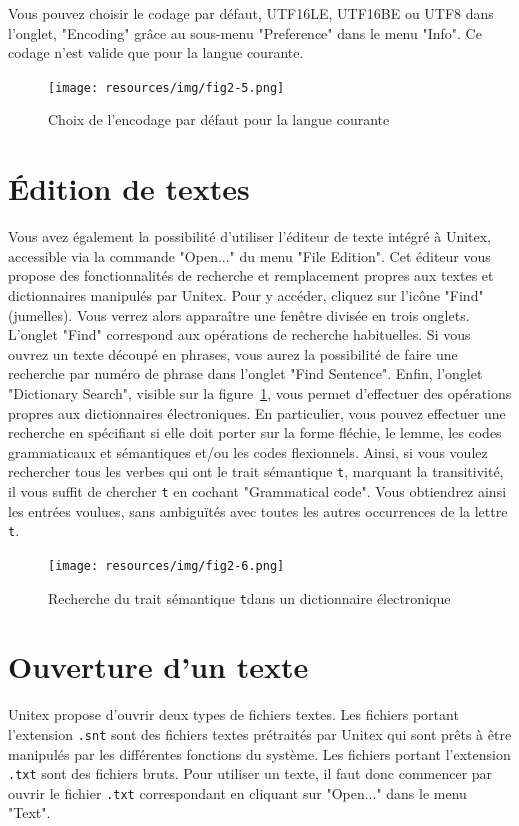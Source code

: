 \bigskip
\noindent 
Vous pouvez choisir le codage par défaut, UTF16LE, UTF16BE ou UTF8 dans l'onglet, "Encoding" grâce
au sous-menu "Preference"  dans le menu "Info". Ce codage n'est valide que pour la langue
courante.

\begin{figure}[!ht]
\begin{center}
\texttt{[image: resources/img/fig2-5.png]}
\caption{Choix de l'encodage par défaut pour la langue courante}
\end{center}
\end{figure}

\section{Édition de textes}
Vous avez également la possibilité d’utiliser l’éditeur de texte intégré à Unitex, accessible
via la commande "Open..." du menu "File Edition". Cet éditeur vous propose des fonctionnalités
de recherche et remplacement propres aux textes et dictionnaires manipulés par Unitex. Pour y
accéder, cliquez sur l’icône "Find" (jumelles). Vous verrez alors apparaître une fenêtre divisée en
trois onglets. L’onglet "Find" correspond aux opérations de recherche habituelles. Si vous ouvrez un
texte découpé en phrases, vous aurez la possibilité de faire une recherche par numéro de phrase dans
l’onglet "Find Sentence". Enfin, l’onglet "Dictionary Search", visible sur la
figure~\ref{dictionary-search}, vous permet d’effectuer des opérations propres aux dictionnaires
électroniques. En particulier, vous pouvez effectuer une recherche en spécifiant si elle doit porter
sur la forme fléchie, le lemme, les codes grammaticaux et sémantiques et/ou les codes flexionnels.
Ainsi, si vous voulez rechercher tous les verbes qui ont le trait sémantique
\verb$t$, marquant la transitivité, il vous suffit de chercher \verb$t$ en cochant
"Grammatical code". Vous obtiendrez ainsi les entrées voulues, sans ambiguïtés avec toutes les
autres occurrences de la lettre \verb$t$.


\begin{figure}[!ht]
\begin{center}
\texttt{[image: resources/img/fig2-6.png]}
\caption{Recherche du trait sémantique \texttt{t}dans un dictionnaire
électronique\label{dictionary-search}}
\end{center}
\end{figure}


\section{Ouverture d’un texte}
\noindent Unitex propose d’ouvrir deux types de fichiers textes. 
Les fichiers portant l’extension \verb+.snt+ sont des fichiers textes prétraités 
par Unitex qui sont prêts à être manipulés par les différentes fonctions du système.
Les fichiers portant l’extension \verb+.txt+ sont des fichiers bruts.
Pour utiliser un texte, il faut donc commencer par ouvrir le fichier  \verb+.txt+
correspondant en cliquant sur "Open..." dans le menu "Text".


